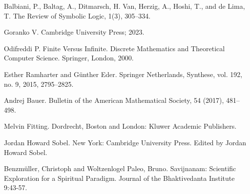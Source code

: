 \documentclass[openany]{book}
\theoremstyle{plain}
\theoremstyle{definition}
\begin{document}
\begin{thebibliography}{2}
    Balbiani, P., Baltag, A., Ditmarsch, H. Van, Herzig, A., Hoshi, T., and de Lima, T.
    \newblock The Review of Symbolic Logic, 1(3), 305--334.

    Goranko V.
    \newblock Cambridge University Press; 2023.

    Odifreddi P.
    \newblock Finite Versus Infinite. Discrete Mathematics and Theoretical Computer Science. Springer, London, 2000.

    Esther Ramharter and G\"{u}nther Eder.
    \newblock Springer Netherlands, Synthese, vol. 192, no. 9, 2015, 2795--2825.

    Andrej Bauer.
    \newblock Bulletin of the American Mathematical Society, 54 (2017), 481--498. 

    Melvin Fitting.
    \newblock Dordrecht, Boston and London: Kluwer Academic Publishers.

    Jordan Howard Sobel.
    \newblock New York: Cambridge University Press. Edited by Jordan Howard Sobel.

    Benzm\"{u}ller, Christoph and Woltzenlogel Paleo, Bruno.
    \newblock Savijnanam: Scientific Exploration for a Spiritual Paradigm. Journal of the Bhaktivedanta Institute 9:43-57.


\end{thebibliography}
\end{document}
